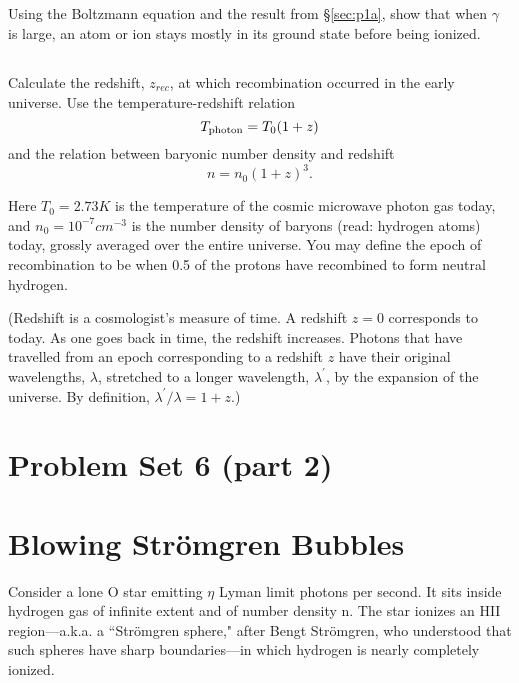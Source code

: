\documentclass[11pt]{article}
\begin{document}
\subsection{}
Using the Boltzmann equation and the result from \S\ref{sec:p1a}, show that when $\gamma$
is large, an atom or ion stays mostly in its ground state before being ionized.

\subsection{}
Calculate the redshift, $z_{rec}$, at which recombination occurred 
in the early universe. Use the temperature-redshift relation
\begin{equation}
T_{\rm photon} = T_0(1+z) 
\end{equation}
and the relation between baryonic number density and redshift
\begin{equation}
n=n_0(1 + z)^3.
\end{equation}

Here $T_0 = 2.73K$ is the temperature of the cosmic microwave photon gas today,
and $n_0 = 10^{-7} cm^{-3}$ is the number density of baryons (read: hydrogen atoms)
today, grossly averaged over the entire universe. You may define the epoch of
recombination to be when 0.5 of the protons have recombined to form neutral
hydrogen.  

(Redshift is a cosmologist’s measure of time. A redshift $z = 0$
corresponds to today. As one goes back in time, the redshift increases. Photons
that have travelled from an epoch corresponding to a redshift $z$ have their
original wavelengths, $\lambda$, stretched to a longer wavelength, $\lambda^\prime$, by the expansion
of the universe. By definition, $\lambda^\prime/\lambda=1+z$.)

\section*{\centering Problem Set 6 (part 2)}

\section{Blowing Str\"omgren Bubbles}\label{p2}

Consider a lone O star emitting $\eta$ Lyman limit photons per second. It sits
inside hydrogen gas of infinite extent and of number density n. The star
ionizes an HII region—a.k.a. a ``Str\"omgren sphere," after Bengt Str\"omgren, who
understood that such spheres have sharp boundaries—in which hydrogen is nearly
completely ionized.
\end{document}
